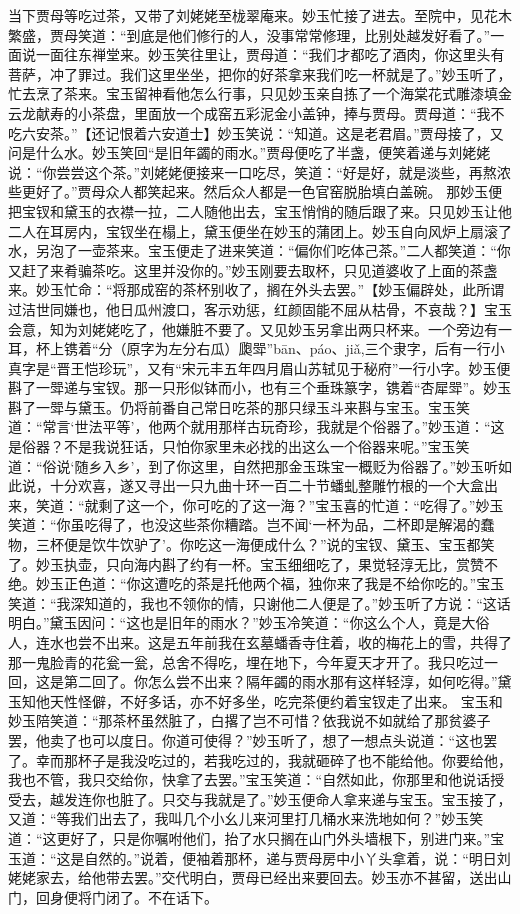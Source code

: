 \documentclass[12pt,oneside]{book}
\begin{document}
当下贾母等吃过茶，又带了刘姥姥至栊翠庵来。妙玉忙接了进去。至院中，见花木繁盛，贾母笑道：“到底是他们修行的人，没事常常修理，比别处越发好看了。”一面说一面往东禅堂来。妙玉笑往里让，贾母道：“我们才都吃了酒肉，你这里头有菩萨，冲了罪过。我们这里坐坐，把你的好茶拿来我们吃一杯就是了。”妙玉听了，忙去烹了茶来。宝玉留神看他怎么行事，只见妙玉亲自拣了一个海棠花式雕漆填金云龙献寿的小茶盘，里面放一个成窑五彩泥金小盖钟，捧与贾母。贾母道：“我不吃六安茶。”【还记恨着六安道士】妙玉笑说：“知道。这是老君眉。”贾母接了，又问是什么水。妙玉笑回“是旧年蠲的雨水。”贾母便吃了半盏，便笑着递与刘姥姥说：“你尝尝这个茶。”刘姥姥便接来一口吃尽，笑道：“好是好，就是淡些，再熬浓些更好了。”贾母众人都笑起来。然后众人都是一色官窑脱胎填白盖碗。
那妙玉便把宝钗和黛玉的衣襟一拉，二人随他出去，宝玉悄悄的随后跟了来。只见妙玉让他二人在耳房内，宝钗坐在榻上，黛玉便坐在妙玉的蒲团上。妙玉自向风炉上扇滚了水，另泡了一壶茶来。宝玉便走了进来笑道：“偏你们吃体己茶。”二人都笑道：“你又赶了来肴骗茶吃。这里并没你的。”妙玉刚要去取杯，只见道婆收了上面的茶盏来。妙玉忙命：“将那成窑的茶杯别收了，搁在外头去罢。”【妙玉偏辟处，此所谓过洁世同嫌也，他日瓜州渡口，客示劝惩，红颜固能不屈从枯骨，不哀哉？】宝玉会意，知为刘姥姥吃了，他嫌脏不要了。又见妙玉另拿出两只杯来。一个旁边有一耳，杯上镌着“分（原字为左分右瓜）瓟斝”bān、páo、jiǎ,三个隶字，后有一行小真字是“晋王恺珍玩”，又有“宋元丰五年四月眉山苏轼见于秘府”一行小字。妙玉便斟了一斝递与宝钗。那一只形似钵而小，也有三个垂珠篆字，镌着“杏犀斝”。妙玉斟了一斝与黛玉。仍将前番自己常日吃茶的那只绿玉斗来斟与宝玉。宝玉笑道：“常言‘世法平等’，他两个就用那样古玩奇珍，我就是个俗器了。”妙玉道：“这是俗器？不是我说狂话，只怕你家里未必找的出这么一个俗器来呢。”宝玉笑道：“俗说‘随乡入乡’，到了你这里，自然把那金玉珠宝一概贬为俗器了。”妙玉听如此说，十分欢喜，遂又寻出一只九曲十环一百二十节蟠虬整雕竹根的一个大盒出来，笑道：“就剩了这一个，你可吃的了这一海？”宝玉喜的忙道：“吃得了。”妙玉笑道：“你虽吃得了，也没这些茶你糟踏。岂不闻‘一杯为品，二杯即是解渴的蠢物，三杯便是饮牛饮驴了’。你吃这一海便成什么？”说的宝钗、黛玉、宝玉都笑了。妙玉执壶，只向海内斟了约有一杯。宝玉细细吃了，果觉轻淳无比，赏赞不绝。妙玉正色道：“你这遭吃的茶是托他两个福，独你来了我是不给你吃的。”宝玉笑道：“我深知道的，我也不领你的情，只谢他二人便是了。”妙玉听了方说：“这话明白。”黛玉因问：“这也是旧年的雨水？”妙玉冷笑道：“你这么个人，竟是大俗人，连水也尝不出来。这是五年前我在玄墓蟠香寺住着，收的梅花上的雪，共得了那一鬼脸青的花瓮一瓮，总舍不得吃，埋在地下，今年夏天才开了。我只吃过一回，这是第二回了。你怎么尝不出来？隔年蠲的雨水那有这样轻淳，如何吃得。”黛玉知他天性怪僻，不好多话，亦不好多坐，吃完茶便约着宝钗走了出来。
宝玉和妙玉陪笑道：“那茶杯虽然脏了，白撂了岂不可惜？依我说不如就给了那贫婆子罢，他卖了也可以度日。你道可使得？”妙玉听了，想了一想点头说道：“这也罢了。幸而那杯子是我没吃过的，若我吃过的，我就砸碎了也不能给他。你要给他，我也不管，我只交给你，快拿了去罢。”宝玉笑道：“自然如此，你那里和他说话授受去，越发连你也脏了。只交与我就是了。”妙玉便命人拿来递与宝玉。宝玉接了，又道：“等我们出去了，我叫几个小幺儿来河里打几桶水来洗地如何？”妙玉笑道：“这更好了，只是你嘱咐他们，抬了水只搁在山门外头墙根下，别进门来。”宝玉道：“这是自然的。”说着，便袖着那杯，递与贾母房中小丫头拿着，说：“明日刘姥姥家去，给他带去罢。”交代明白，贾母已经出来要回去。妙玉亦不甚留，送出山门，回身便将门闭了。不在话下。
\end{document}
